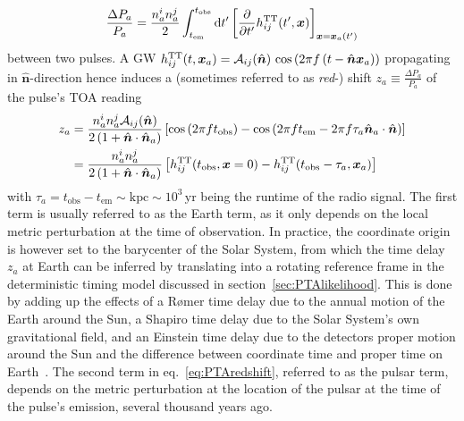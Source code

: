 \begin{align}
	\frac{\Delta P_a}{P_a} = \frac{n_a^i n_a^j}{2} \int_{t_{\text{em}}}^{t_{\text{obs}}} \mathop{}\!\mathrm{d} t^\prime\left[  \frac{\partial }{\partial t^\prime} h_{ij}^{\text{TT}}(t^\prime, \bm{x}) \right]_{\bm{x} = \bm{x}_a(t^\prime)} 
\end{align}
between two pulses. A \ac{GW} $h_{ij}^{\text{TT}}(t, \bm{x}_a) = \mathcal{A}_{ij}(\hat{\bm{n}}) \, \cos \left( 2 \pi f \left( t - \hat{\bm{n}} \bm{x}_a \right) \right)$ propagating in $\hat{\bm{n}}$-direction hence induces a (sometimes referred to as \textit{red}-) shift $z_a \equiv \frac{\Delta P_a}{P_a}$ of the pulse's \ac{TOA} reading
\begin{align}
	 z_a &= \frac{n_a^i n_a^j \mathcal{A}_{ij}(\hat{\bm{n}})}{2 \left( 1 + \hat{\bm{n}} \cdot \hat{\bm{n}}_a  \right)} \left[ \cos \left( 2 \pi f t_\text{obs} \right) - {\cos \left( 2 \pi f t_\text{em} - 2 \pi f \tau_a \hat{\bm{n}}_a \cdot \hat{\bm{n}} \right)} \right] \\
		&=  \frac{n_a^i n_a^j}{2 \left( 1 + \hat{\bm{n}} \cdot \hat{\bm{n}}_a  \right)} \left[ h_{ij}^{\text{TT}}(t_\text{obs}, \bm{x} = 0) - h_{ij}^{\text{TT}}(t_\text{obs} - \tau_a, \bm{x}_a) \right] \label{eq:PTAredshift}
\end{align}
with $\tau_a = t_\text{obs} - t_\text{em} \sim \text{kpc} \sim 10^3 \, \text{yr}$ being the runtime of the radio signal. The first term is usually referred to as the Earth term, as it only depends on the local metric perturbation at the time of observation. In practice, the coordinate origin is however set to the barycenter of the Solar System, from which the time delay $z_a$ at Earth can be inferred by translating into a rotating reference frame in the deterministic timing model discussed in section~\ref{sec:PTAlikelihood}. This is done by adding up the effects of a Rømer time delay due to the annual motion of the  Earth around the Sun, a Shapiro time delay due to the Solar System's own gravitational field, and an Einstein time delay due to the detectors proper motion around the Sun and the difference between coordinate time and proper time on Earth~\cite{Taylor:2021yjx}. The second term in eq.~\eqref{eq:PTAredshift}, referred to as the pulsar term, depends on the metric perturbation at the location of the pulsar at the time of the pulse's emission, several thousand years ago.

